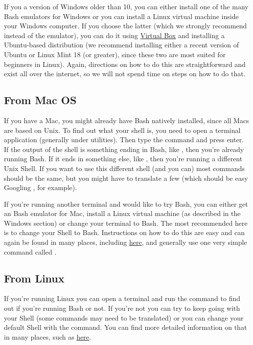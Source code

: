 \documentclass[letterpaper,10pt,openany,oneside]{sphinxmanual}
\begin{document}
If you a version of Windows older than 10, you can either install one of the
many Bash emulators for Windows or you can install a Linux virtual machine
inside your Windows computer. If you choose the latter (which we strongly
recommend instead of the emulator), you can do it using \href{https://www.virtualbox.org/wiki/Downloads}{Virtual Box} and installing a Ubuntu-based
distribution (we recommend installing either a recent version of Ubuntu or
Linux Mint 18 (or greater), since these two are most suited for beginners in
Linux). Again, directions on how to do this are straightforward and exist all
over the internet, so we will not spend time on steps on how to do that.


\subsection{From Mac OS}
\label{bash:from-mac-os}
If you have a Mac, you might already have Bash natively installed, since all
Macs are based on Unix. To find out what your shell is, you need to open a
terminal application (generally under utilities). Then type the command  and press enter. If the output of the shell is something ending in
Bash, like , then you're already running Bash. If it ends in
something else, like , then you're running a different Unix Shell.
If you want to use this different shell (and you can) most commands should be
the same, but you might have to translate a few (which should be easy Googling
, for example).

If you're running another terminal and would like to try Bash, you can either
get an Bash emulator for Mac, install a Linux virtual machine (as described in
the Windows section) or change your terminal to Bash. The most recommended here
is to change your Shell to Bash. Instructions on how to do this are easy and
can again be found in many places, including \href{http://osxdaily.com/2012/03/21/change-shell-mac-os-x/}{here}, and generally use
one very simple command called .


\subsection{From Linux}
\label{bash:from-linux}
If you're running Linux you can open a terminal and run the command  to find out if you're running Bash or not. If you're not you can try to
keep going with your Shell (some commands may need to be translated) or you can
change your default Shell with the  command. You can find more detailed
information on that in many places, such as \href{http://stackoverflow.com/questions/13046192/changing-default-shell-in-linux}{here}.
\end{document}
